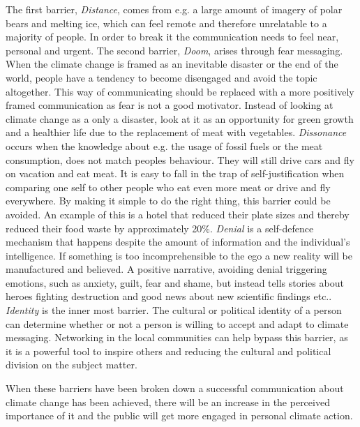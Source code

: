         The first barrier, \textit{Distance}, comes from e.g. a large amount of imagery of polar bears and melting ice, which can feel remote and therefore unrelatable to a majority of people\citep[p.~108]{storyAboutClimateChange}. In order to break it the communication needs to feel near, personal and urgent\cite{the5Ds}.
        The second barrier, \textit{Doom}, arises through fear messaging. When the climate change is framed as an inevitable disaster or the end of the world, people have a tendency to become disengaged and avoid the topic altogether\citep[p.~109]{storyAboutClimateChange}. This way of communicating should be replaced with a more positively framed communication as fear is not a good motivator. Instead of looking at climate change as a only a disaster, look at it as an opportunity for green growth and a healthier life due to the replacement of meat with vegetables\cite{the5Ds}.
        \textit{Dissonance} occurs when the knowledge about e.g. the usage of fossil fuels or the meat consumption, does not match peoples behaviour. They will still drive cars and fly on vacation and eat meat. It is easy to fall in the trap of self-justification when comparing one self to other people who eat even more meat or drive and fly everywhere\citep[p.~109]{storyAboutClimateChange}. By making it simple to do the right thing, this barrier could be avoided. An example of this is a hotel that reduced their plate sizes and thereby reduced their food waste by approximately 20\%\cite{the5Ds}.
        \textit{Denial} is a self-defence mechanism that happens despite the amount of information and the individual's intelligence\citep[p.~109]{storyAboutClimateChange}. If something is too incomprehensible to the ego a new reality will be manufactured and believed. A positive narrative, avoiding denial triggering emotions, such as anxiety, guilt, fear and shame, but instead tells stories about heroes fighting destruction and good news about new scientific findings etc.\cite{the5Ds}.
        \textit{Identity} is the inner most barrier. The cultural or political identity of a person can determine whether or not a person is willing to accept and adapt to climate messaging\citep[p.~109]{storyAboutClimateChange}. Networking in the local communities can help bypass this barrier, as it is a powerful tool to inspire others and reducing the cultural and political division on the subject matter\citep[p.~133]{storyAboutClimateChange}\cite{the5Ds}.
        
        When these barriers have been broken down a successful communication about climate change has been achieved, there will be an increase in the perceived importance of it and the public will get more engaged in personal climate action\cite{the5Ds}.
        
